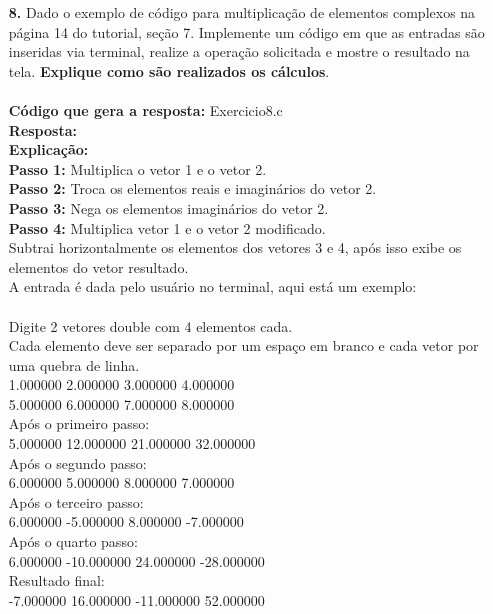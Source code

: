 \documentclass[oneside,a4paper,12pt]{article}
\renewcommand{\b}{\textbf}
\begin{document}
\begin{enumerate}
   \item[\b{8.}] Dado o exemplo de código para multiplicação de elementos complexos na página 14 do tutorial, seção 7. Implemente um código em que as entradas são inseridas via terminal, realize a operação solicitada e mostre o resultado na tela. \b{Explique como são realizados os cálculos}.\\
   \\
   \b{Código que gera a resposta:} Exercicio8.c\\
   \b{Resposta:}\\
   \b{Explicação:}\\
   \b{Passo 1:} Multiplica o vetor 1 e o vetor 2.\\
   \b{Passo 2:} Troca os elementos reais e imaginários do vetor 2.\\
   \b{Passo 3:} Nega os elementos imaginários do vetor 2.\\
   \b{Passo 4:} Multiplica vetor 1 e o vetor 2 modificado.\\
   Subtrai horizontalmente os elementos dos vetores 3 e 4, após isso exibe os elementos do vetor resultado.\\
    A entrada é dada pelo usuário no terminal, aqui está um exemplo:\\
    \\
    Digite 2 vetores double com 4 elementos cada.\\
    Cada elemento deve ser separado por um espaço em branco e cada vetor por uma quebra de linha.\\
    1.000000 2.000000 3.000000 4.000000\\
    5.000000 6.000000 7.000000 8.000000\\
    Após o primeiro passo:\\
    5.000000 12.000000 21.000000 32.000000\\
    Após o segundo passo:\\
    6.000000 5.000000 8.000000 7.000000\\
    Após o terceiro passo:\\
    6.000000 -5.000000 8.000000 -7.000000\\
    Após o quarto passo:\\
    6.000000 -10.000000 24.000000 -28.000000\\
    Resultado final:\\
    -7.000000 16.000000 -11.000000 52.000000\\

   
\end{enumerate}
\end{document}
